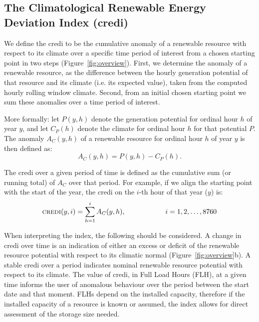 \documentclass[a4paper,11pt]{extarticle}
\newcommand{\credi}[0]{{\sc credi}}
\begin{document}

\subsection{The Climatological Renewable Energy Deviation Index (\credi)}
We define the \credi{} to be the cumulative anomaly of a renewable resource with respect to its climate over a specific time period of interest from a chosen starting point in two steps (Figure~\ref{fig:overview}). 
First, we determine the anomaly of a renewable resource, as the difference between the hourly generation potential of that resource and its climate (i.e. its expected value), taken from the computed hourly rolling window climate. 
Second, from an initial chosen starting point we sum these anomalies over a time period of interest.

More formally: let $P(y,h)$ denote the generation potential for ordinal hour $h$ of year $y$, and let $C_P(h)$ denote the climate for ordinal hour $h$ for that potential $P$. 
The anomaly $A_C(y,h)$ of a renewable resource for ordinal hour $h$ of year $y$ is then defined as:
\begin{equation}
        A_C(y,h) = P(y,h) - C_P(h).
\end{equation}

The \credi{} over a given period of time is defined as the cumulative sum (or running total) of $A_C$ over that period. 
For example, if we align the starting point with the start of the year, the \credi{} on the $i$-th hour of that year ($y$) is:
\begin{equation}
        \mbox{\credi}(y,i) = \sum_{h=1}^{i} A_C(y,h), \hspace{2cm} i = 1,2,\ldots,8760
\end{equation}

When interpreting the index, the following should be considered. 
A change in \credi{} over time is an indication of either an excess or deficit of the renewable resource potential with respect to its climatic normal (Figure~\ref{fig:overview}b). 
A stable \credi{} over a period indicates nominal renewable resource potential with respect to its climate. 
The value of \credi{}, in Full Load Hours (FLH), at a given time informs the user of anomalous behaviour over the period between the start date and that moment. 
FLHs depend on the installed capacity, therefore if the installed capacity of a resource is known or assumed, the index allows for direct assessment of the storage size needed.
\end{document}
